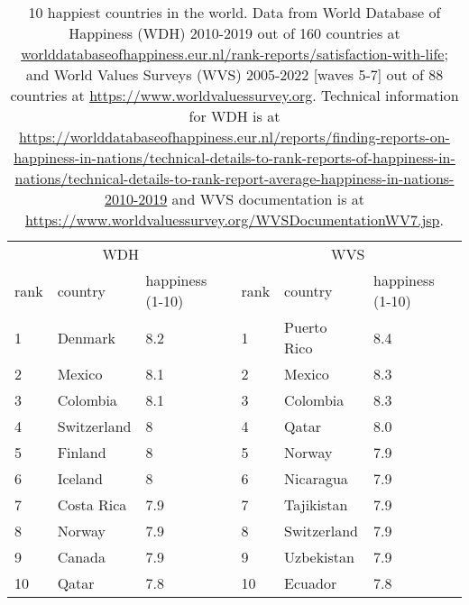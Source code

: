 \documentclass[10pt, letterpaper]{article}
\begin{document}
\begin{spacing}{2}
\begin{table}[H]\centering\footnotesize
\caption{\label{t1}  10 happiest countries in the world. Data from World
  Database of Happiness (WDH) 2010-2019 out of 160 countries at
 \url{worlddatabaseofhappiness.eur.nl/rank-reports/satisfaction-with-life}; 
 and World Values Surveys (WVS) 2005-2022 [waves 5-7] out of 88 countries at  
 \url{https://www.worldvaluessurvey.org}. Technical information for WDH is at
 \url{https://worlddatabaseofhappiness.eur.nl/reports/finding-reports-on-happiness-in-nations/technical-details-to-rank-reports-of-happiness-in-nations/technical-details-to-rank-report-average-happiness-in-nations-2010-2019}
and WVS documentation is at \url{https://www.worldvaluessurvey.org/WVSDocumentationWV7.jsp}.}
\begin{tabular} {@{} lll|lll @{}}   \hline
 \multicolumn{3}{c}{WDH}&\multicolumn{3}{c}{WVS}\\
  rank& country&  happiness (1-10)&  rank& country&  happiness (1-10) \\ \hline
 1 	&	Denmark	        &	8.2   & 1 	&     Puerto Rico &  8.4   \\                          
 2 	&	Mexico	        &	8.1   & 2 	&          Mexico &  8.3   \\                          
 3 	&	Colombia	&	8.1   & 3 	&         Colombia&  8.3   \\                  
 4 	&	Switzerland	&	8     & 4 	&           Qatar &  8.0   \\                  
 5 	&	Finland	        &	8     & 5 	&          Norway &  7.9   \\                          
 6 	&	Iceland	        &	8     & 6 	&       Nicaragua &  7.9   \\                          
 7 	&	Costa Rica	&	7.9   & 7 	&      Tajikistan &  7.9   \\                  
 8 	&	Norway	        &	7.9   & 8 	&     Switzerland &  7.9   \\                          
 9 	&	Canada	        &	7.9   & 9 	&      Uzbekistan &  7.9   \\                          
 10	&	Qatar         	&	7.8   & 10	&         Ecuador &  7.8   \\\hline                          

\end{tabular}
\end{table}
\end{spacing}
\end{document}
